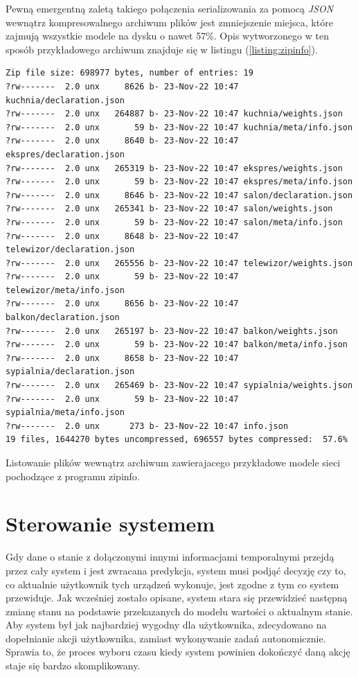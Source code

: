 Pewną emergentną zaletą takiego połączenia serializowania za pomocą \textit{JSON} wewnątrz kompresowalnego archiwum plików jest zmniejszenie miejsca, które zajmują wszystkie modele na dysku o nawet 57\%. Opis wytworzonego w ten sposób przykładowego archiwum znajduje się w listingu (\ref{listing:zipinfo}).

\begin{listing}
\begin{verbatim}
Zip file size: 698977 bytes, number of entries: 19
?rw-------  2.0 unx     8626 b- 23-Nov-22 10:47 kuchnia/declaration.json
?rw-------  2.0 unx   264887 b- 23-Nov-22 10:47 kuchnia/weights.json
?rw-------  2.0 unx       59 b- 23-Nov-22 10:47 kuchnia/meta/info.json
?rw-------  2.0 unx     8640 b- 23-Nov-22 10:47 ekspres/declaration.json
?rw-------  2.0 unx   265319 b- 23-Nov-22 10:47 ekspres/weights.json
?rw-------  2.0 unx       59 b- 23-Nov-22 10:47 ekspres/meta/info.json
?rw-------  2.0 unx     8646 b- 23-Nov-22 10:47 salon/declaration.json
?rw-------  2.0 unx   265341 b- 23-Nov-22 10:47 salon/weights.json
?rw-------  2.0 unx       59 b- 23-Nov-22 10:47 salon/meta/info.json
?rw-------  2.0 unx     8648 b- 23-Nov-22 10:47 telewizor/declaration.json
?rw-------  2.0 unx   265556 b- 23-Nov-22 10:47 telewizor/weights.json
?rw-------  2.0 unx       59 b- 23-Nov-22 10:47 telewizor/meta/info.json
?rw-------  2.0 unx     8656 b- 23-Nov-22 10:47 balkon/declaration.json
?rw-------  2.0 unx   265197 b- 23-Nov-22 10:47 balkon/weights.json
?rw-------  2.0 unx       59 b- 23-Nov-22 10:47 balkon/meta/info.json
?rw-------  2.0 unx     8658 b- 23-Nov-22 10:47 sypialnia/declaration.json
?rw-------  2.0 unx   265469 b- 23-Nov-22 10:47 sypialnia/weights.json
?rw-------  2.0 unx       59 b- 23-Nov-22 10:47 sypialnia/meta/info.json
?rw-------  2.0 unx      273 b- 23-Nov-22 10:47 info.json
19 files, 1644270 bytes uncompressed, 696557 bytes compressed:  57.6%
\end{verbatim}
\caption{Listowanie plików wewnątrz archiwum zawierajacego przykładowe modele sieci pochodzące z programu zipinfo.} \label{listing:zipinfo}
\end{listing}
\section{Sterowanie systemem}
Gdy dane o stanie z dołączonymi innymi informacjami temporalnymi przejdą przez cały system i jest zwracana predykcja, system musi podjąć decyzję czy to, co aktualnie użytkownik tych urządzeń wykonuje, jest zgodne z tym co system przewiduje. Jak wcześniej zostało opisane, system stara się przewidzieć następną zmianę stanu na podstawie przekazanych do modelu wartości o aktualnym stanie. Aby system był jak najbardziej wygodny dla użytkownika, zdecydowano na dopełnianie akcji użytkownika, zamiast wykonywanie zadań autonomicznie. Sprawia to, że proces wyboru czasu kiedy system powinien dokończyć daną akcję staje się bardzo skomplikowany.

